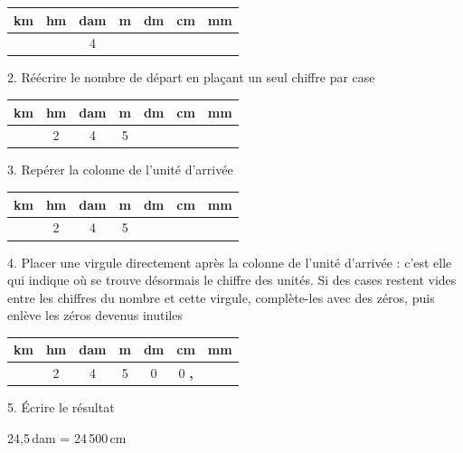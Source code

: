 {\footnotesize
\def\arraystretch{1.1}
\begin{tabularx}{\linewidth}{|*{7}{C|}}
\hline
km & hm & dam & m & dm & cm & mm \\\hline
&& 4 &&&& \\\hline
\end{tabularx}
\def\arraystretch{1}}

\vspace{10pt}
2. Réécrire le nombre de départ en plaçant un seul chiffre par case

{\footnotesize
\def\arraystretch{1.1}
\begin{tabularx}{\linewidth}{|*{7}{C|}}
\hline
km & hm & dam & m & dm &cm & mm \\\hline
& 2 & 4 & 5 &&& \\\hline
\end{tabularx}
\def\arraystretch{1}}

\vspace{10pt}
3. Repérer la colonne de l'unité d'arrivée

{\footnotesize
\def\arraystretch{1.1}
\begin{tabularx}{\linewidth}{|*{7}{C|}}
\hline
km & hm & dam & m & dm &cm & mm \\\hline
& 2 & 4 & 5 &&& \\\hline
\end{tabularx}
\def\arraystretch{1}}

\vspace{10pt}
4. Placer une virgule directement après la colonne de l'unité d'arrivée : c'est elle qui indique où se trouve désormais le chiffre des unités. Si des cases restent vides entre les chiffres du nombre et cette virgule, complète-les avec des zéros, puis enlève les zéros devenus inutiles

{\footnotesize
\def\arraystretch{1.1}
\begin{tabularx}{\linewidth}{|*{7}{C|}}
\hline
km & hm & dam & m & dm &cm & mm \\\hline
& 2 & 4 & 5 & 0 & \hspace{28pt}0 \hfill\textcolor{themeColor}{\textbf{,}}& \\\hline
\end{tabularx}
\def\arraystretch{1}}

\vspace{10pt}
5. Écrire le résultat

24,5\,dam = 24\,500\,cm

